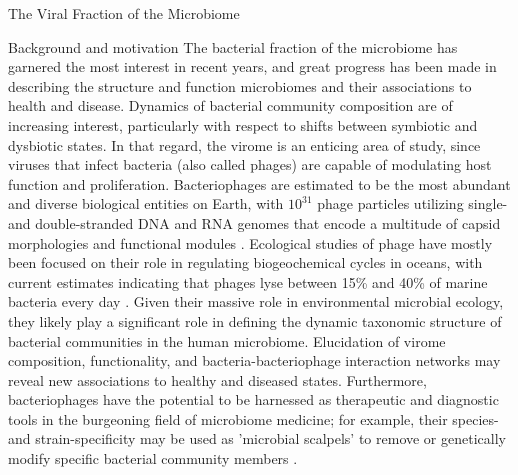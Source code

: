 \documentclass[oneside,12pt,final]{sty/ucthesis-CA2012}
\begin{document}
\begin{mainmatter}
\begin{section}{The Viral Fraction of the Microbiome}
\begin{subsection}{Background and motivation}
The bacterial fraction of the microbiome has garnered the most interest in recent years, and great progress has been made in describing the structure and function microbiomes and their associations to health and disease. Dynamics of bacterial community composition are of increasing interest, particularly with respect to shifts between symbiotic and dysbiotic states. In that regard, the virome is an enticing area of study, since viruses that infect bacteria (also called phages) are capable of modulating host function and proliferation. Bacteriophages are estimated to be the most abundant and diverse biological entities on Earth, with $10^{31}$ phage particles utilizing single- and double-stranded DNA and RNA genomes that encode a multitude of capsid morphologies and functional modules \cite{RN122}. Ecological studies of phage have mostly been focused on their role in regulating biogeochemical cycles in oceans, with current estimates indicating that phages lyse between 15\% and 40\% of marine bacteria every day \cite{RN123}. Given their massive role in environmental microbial ecology, they likely play a significant role in defining the dynamic taxonomic structure of bacterial communities in the human microbiome. Elucidation of virome composition, functionality, and bacteria-bacteriophage interaction networks may reveal new associations to healthy and diseased states. Furthermore, bacteriophages have the potential to be harnessed as therapeutic and diagnostic tools in the burgeoning field of microbiome medicine; for example, their species- and strain-specificity may be used as 'microbial scalpels' to remove or genetically modify specific bacterial community members \cite{RN124}.
\end{subsection}


\end{section}
\end{mainmatter}
\end{document}
